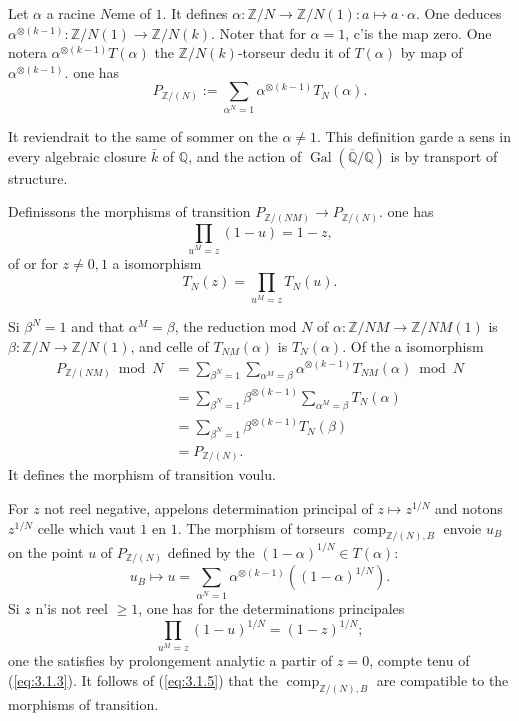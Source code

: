\documentclass[12pt,a4paper]{article}
\theoremstyle{plain}
\theoremstyle{definition}
\theoremstyle{remark}
\DeclareMathOperator{\Gal}{Gal}
\providecommand{\Gal}{\operatorname{Gal}}
\providecommand{\comp}{\operatorname{comp}}
\begin{document}
Let $\alpha$ a racine $N$eme of $1$. It defines $\alpha: \mathbb{Z}/N \to
\mathbb{Z}/N(1): a \mapsto a \cdot \alpha$. One deduces
$\alpha^{\otimes(k-1)}: \mathbb{Z}/N(1) \to \mathbb{Z}/N(k)$. Noter that for
$\alpha = 1$, c'is the map zero. One notera
$\alpha^{\otimes(k-1)} T(\alpha)$ the $\mathbb{Z}/N(k)$-torseur dedu it of $T(\alpha)$ by
map of $\alpha^{\otimes(k-1)}$. one has
\begin{equation}\label{eq:3.1.2}
P_{\mathbb{Z}/(N)} := \sum_{\alpha^N=1} \alpha^{\otimes(k-1)} T_N(\alpha).
\end{equation}

It reviendrait to the same of sommer on the $\alpha \neq 1$. This definition garde a
sens in every algebraic closure $\bar{k}$ of $\mathbb{Q}$, and the action of
$\Gal(\overline{\mathbb{Q}}/\mathbb{Q})$ is by transport of structure.

Definissons the morphisms of transition $P_{\mathbb{Z}/(NM)} \to
P_{\mathbb{Z}/(N)}$. one has
\begin{equation}\label{eq:3.1.3}
\prod_{u^M=z} (1-u) = 1-z,
\end{equation}
of or for $z \neq 0, 1$ a isomorphism
\begin{equation}\label{eq:3.1.4}
T_N(z) = \prod_{u^M=z} T_N(u).
\end{equation}

Si $\beta^N = 1$ and that $\alpha^M = \beta$, the reduction mod $N$ of $\alpha:
\mathbb{Z}/NM \to \mathbb{Z}/NM(1)$ is $\beta: \mathbb{Z}/N \to
\mathbb{Z}/N(1)$, and celle of $T_{NM}(\alpha)$ is $T_N(\alpha)$. Of the a
isomorphism
\begin{align*}
P_{\mathbb{Z}/(NM)} \bmod N &= \sum_{\beta^N=1} \sum_{\alpha^M=\beta}
\alpha^{\otimes(k-1)} T_{NM}(\alpha) \bmod N \\
&= \sum_{\beta^N=1} \beta^{\otimes(k-1)} \sum_{\alpha^M=\beta} T_N(\alpha) \\
&= \sum_{\beta^N=1} \beta^{\otimes(k-1)} T_N(\beta) \\
&= P_{\mathbb{Z}/(N)}.
\end{align*}
It defines the morphism of transition voulu.

For $z$ not reel negative, appelons determination principal of $z \mapsto z^{1/N}$
and notons $z^{1/N}$ celle which vaut $1$ en $1$. The morphism of torseurs
$\comp_{\mathbb{Z}/(N),B}$ envoie $u_B$ on the point $u$ of $P_{\mathbb{Z}/(N)}$
defined by the $(1-\alpha)^{1/N} \in T(\alpha)$:
\begin{equation*}
u_B \longmapsto u = \sum_{\alpha^N=1} \alpha^{\otimes(k-1)} ((1-\alpha)^{1/N}).
\end{equation*}
Si $z$ n'is not reel $\geq 1$, one has for the determinations principales
\begin{equation}\label{eq:3.1.5}
\prod_{u^M=z} (1-u)^{1/N} = (1-z)^{1/N};
\end{equation}
one the satisfies by prolongement analytic a partir of $z = 0$, compte tenu of
(\ref{eq:3.1.3}). It follows of (\ref{eq:3.1.5}) that the
$\comp_{\mathbb{Z}/(N),B}$ are compatible to the morphisms of transition.
\end{document}
